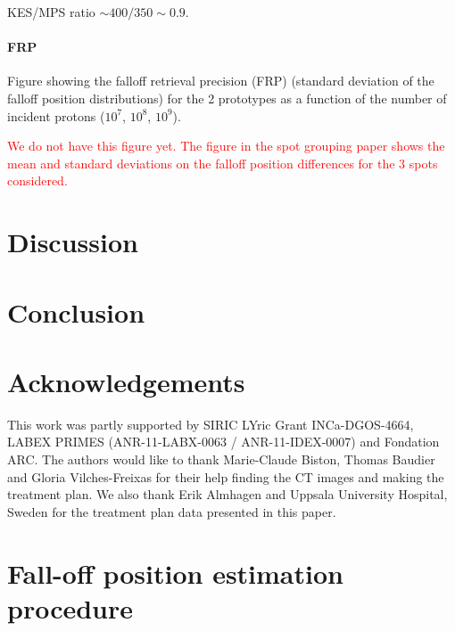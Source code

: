 \documentclass[a4paper,english]{article}
\begin{document}
KES/MPS ratio $\sim 400/350 \sim 0.9$.

\paragraph{FRP}

Figure showing the falloff retrieval precision (FRP) (standard deviation of the falloff position distributions) for the 2 prototypes as a function of the number of incident protons ($10^7$, $10^8$, $10^9$).

\textcolor{red}{We do not have this figure yet. The figure in the spot grouping paper shows the mean and standard deviations on the falloff position differences for the 3 spots considered. }

\section{Discussion}


\section{Conclusion}


\section{Acknowledgements}

This work was partly supported by SIRIC LYric Grant INCa-DGOS-4664, LABEX PRIMES (ANR-11-LABX-0063 / ANR-11-IDEX-0007) and Fondation ARC. The authors would like to thank Marie-Claude Biston, Thomas Baudier and Gloria Vilches-Freixas for their help finding the CT images and making the treatment plan. We also thank Erik Almhagen and Uppsala University Hospital, Sweden for the treatment plan data presented in this paper.

\newpage

\appendix
% 

\section{Fall-off position estimation procedure}\label{sec:fopproc}
\end{document}
